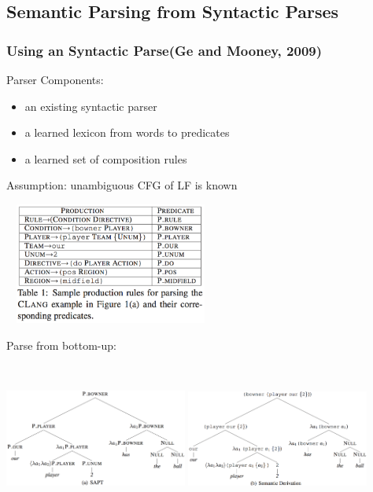 \documentclass{beamer}
\begin{document}
\subsection{Semantic Parsing from Syntactic Parses}

\begin{frame}
    \frametitle{Using an Syntactic Parse(Ge and Mooney, 2009)}
     {
        Parser Components:
        \begin{itemize}
            \item an existing syntactic parser
            \item a learned lexicon from words to predicates
            \item a learned set of composition rules
        \end{itemize}

        Assumption: unambiguous CFG of LF is known
        \begin{center}
            \includegraphics[width=7cm,height=4cm]{img/robocup-mr-grammar.png}
        \end{center}
    }

     {
        Parse from bottom-up:
        \begin{center}
            \includegraphics[width=6cm,height=5cm]{img/sapt-parse-01.png}
            \includegraphics[width=6cm,height=5cm]{img/sapt-parse-02.png}
        \end{center}
    }


\end{frame}
\end{document}
